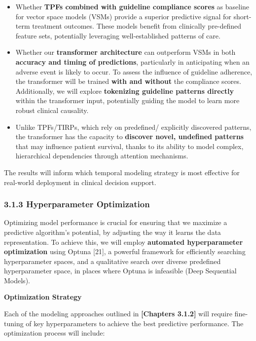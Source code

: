 \documentclass[
]{article}
\begin{document}
\begin{itemize}
\item
  Whether \textbf{TPFs combined with guideline compliance scores} as
  baseline for vector space models (VSMs) provide a superior predictive
  signal for short-term treatment outcomes. These models benefit from
  clinically pre-defined feature sets, potentially leveraging
  well-established patterns of care.
\item
  Whether our \textbf{transformer architecture} can outperform VSMs in
  both \textbf{accuracy and timing of predictions}, particularly in
  anticipating when an adverse event is likely to occur. To assess the
  influence of guideline adherence, the transformer will be trained
  \textbf{with and without} the compliance scores. Additionally, we will
  explore \textbf{tokenizing guideline patterns directly} within the
  transformer input, potentially guiding the model to learn more robust
  clinical causality.
\item
  Unlike TPFs/TIRPs, which rely on predefined/ explicitly discovered
  patterns, the transformer has the capacity to \textbf{discover novel,
  undefined patterns} that may influence patient survival, thanks to its
  ability to model complex, hierarchical dependencies through attention
  mechanisms.
\end{itemize}

The results will inform which temporal modeling strategy is most
effective for real-world deployment in clinical decision support.

\subsubsection{3.1.3 Hyperparameter
Optimization}\label{hyperparameter-optimization}

Optimizing model performance is crucial for ensuring that we maximize a
predictive algorithm's potential, by adjusting the way it learns the
data representation. To achieve this, we will employ \textbf{automated
hyperparameter optimization} using Optuna {[}21{]}, a powerful framework
for efficiently searching hyperparameter spaces, and a qualitative
search over diverse predefined hyperparameter space, in places where
Optuna is infeasible (Deep Sequential Models).

\textbf{Optimization Strategy}

Each of the modeling approaches outlined in \textbf{{[}Chapters
3.1.2{]}} will require fine-tuning of key hyperparameters to achieve the
best predictive performance. The optimization process will include:
\end{document}

